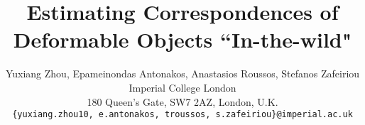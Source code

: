 \title{Estimating Correspondences of Deformable Objects ``In-the-wild"}

\author{Yuxiang Zhou, Epameinondas Antonakos, Anastasios Roussos, Stefanos Zafeiriou\\
Imperial College London\\
180 Queen’s Gate, SW7 2AZ, London, U.K.\\
{\tt\small \{yuxiang.zhou10, e.antonakos, troussos, s.zafeiriou\}@imperial.ac.uk}}
